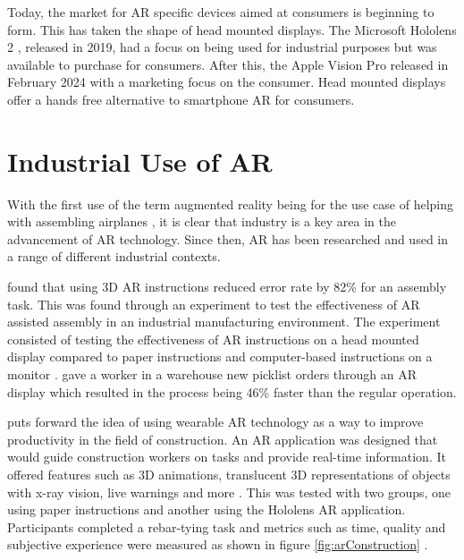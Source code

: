\documentclass{l4proj}
\begin{document}

Today, the market for AR specific devices aimed at consumers is beginning to form. This has taken the shape of head mounted displays. The Microsoft Hololens 2 \citep{microsoft_hololens_2019}, released in 2019, had a focus on being used for industrial purposes but was available to purchase for consumers. After this, the Apple Vision Pro \citep{apple_apple_2024} released in February 2024 with a marketing focus on the consumer. Head mounted displays offer a hands free alternative to smartphone AR for consumers. 

\section{Industrial Use of AR}

With the first use of the term augmented reality being for the use case of helping with assembling airplanes \citep{caudell1992augmented}, it is clear that industry is a key area in the advancement of AR technology. Since then, AR has been researched and used in a range of different industrial contexts.

\citet{Tang2004} found that using 3D AR instructions reduced error rate by 82\% for an assembly task. This was found through an experiment to test the effectiveness of AR assisted assembly in an industrial manufacturing environment. The experiment consisted of testing the effectiveness of AR instructions on a head mounted display compared to paper instructions and computer-based instructions on a monitor \citep{Tang2004}. \citet{upskill_upskill_2017} gave a worker in a warehouse new picklist orders through an AR display which resulted in the process being 46\% faster than the regular operation.

\citet{wu_cognitive_2023} puts forward the idea of using wearable AR technology as a way to improve productivity in the field of construction. An AR application was designed that would guide construction workers on tasks and provide real-time information. It offered features such as 3D animations, translucent 3D representations of objects with x-ray vision, live warnings and more \citep{wu_cognitive_2023}. This was tested with two groups, one using paper instructions and another using the Hololens AR application. Participants completed a rebar-tying task and metrics such as time, quality and subjective experience were measured as shown in figure \ref{fig:arConstruction} \citep{wu_cognitive_2023}. 
\end{document}
